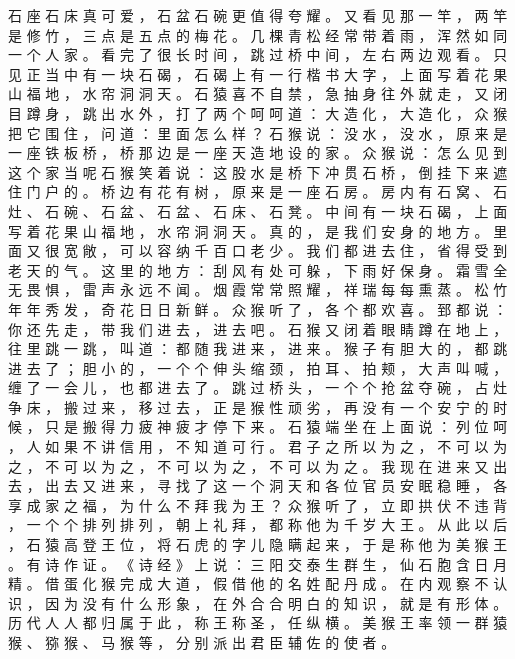 {石 座 石 床 真 可 爱 ， 石 盆 石 碗 更 值 得 夸 耀 。
又 看 见 那 一 竿 ， 两 竿 是 修 竹 ， 三 点 是 五 点 的 梅 花 。
几 棵 青 松 经 常 带 着 雨 ， 浑 然 如 同 一 个 人 家 。
看 完 了 很 长 时 间 ， 跳 过 桥 中 间 ， 左 右 两 边 观 看 。
只 见 正 当 中 有 一 块 石 碣 ， 石 碣 上 有 一 行 楷 书 大 字 ， 上 面 写 着 花 果 山 福 地 ， 水 帘 洞 洞 天 。
石 猿 喜 不 自 禁 ， 急 抽 身 往 外 就 走 ， 又 闭 目 蹲 身 ， 跳 出 水 外 ， 打 了 两 个 呵 呵 道 ： 大 造 化 ， 大 造 化 ， 众 猴 把 它 围 住 ， 问 道 ： 里 面 怎 么 样 ？ 石 猴 说 ： 没 水 ， 没 水 ， 原 来 是 一 座 铁 板 桥 ， 桥 那 边 是 一 座 天 造 地 设 的 家 。
众 猴 说 ： 怎 么 见 到 这 个 家 当 呢 石 猴 笑 着 说 ： 这 股 水 是 桥 下 冲 贯 石 桥 ， 倒 挂 下 来 遮 住 门 户 的 。
桥 边 有 花 有 树 ， 原 来 是 一 座 石 房 。
房 内 有 石 窝 、 石 灶 、 石 碗 、 石 盆 、 石 盆 、 石 床 、 石 凳 。
中 间 有 一 块 石 碣 ， 上 面 写 着 花 果 山 福 地 ， 水 帘 洞 洞 天 。
真 的 ， 是 我 们 安 身 的 地 方 。
里 面 又 很 宽 敞 ， 可 以 容 纳 千 百 口 老 少 。
我 们 都 进 去 住 ， 省 得 受 到 老 天 的 气 。
这 里 的 地 方 ： 刮 风 有 处 可 躲 ， 下 雨 好 保 身 。
霜 雪 全 无 畏 惧 ， 雷 声 永 远 不 闻 。
烟 霞 常 常 照 耀 ， 祥 瑞 每 每 熏 蒸 。
松 竹 年 年 秀 发 ， 奇 花 日 日 新 鲜 。
众 猴 听 了 ， 各 个 都 欢 喜 。
郅 都 说 ： 你 还 先 走 ， 带 我 们 进 去 ， 进 去 吧 。
石 猴 又 闭 着 眼 睛 蹲 在 地 上 ， 往 里 跳 一 跳 ， 叫 道 ： 都 随 我 进 来 ， 进 来 。
猴 子 有 胆 大 的 ， 都 跳 进 去 了 ； 胆 小 的 ， 一 个 个 伸 头 缩 颈 ， 拍 耳 、 拍 颊 ， 大 声 叫 喊 ， 缠 了 一 会 儿 ， 也 都 进 去 了 。
跳 过 桥 头 ， 一 个 个 抢 盆 夺 碗 ， 占 灶 争 床 ， 搬 过 来 ， 移 过 去 ， 正 是 猴 性 顽 劣 ， 再 没 有 一 个 安 宁 的 时 候 ， 只 是 搬 得 力 疲 神 疲 才 停 下 来 。
石 猿 端 坐 在 上 面 说 ： 列 位 呵 ， 人 如 果 不 讲 信 用 ， 不 知 道 可 行 。
君 子 之 所 以 为 之 ， 不 可 以 为 之 ， 不 可 以 为 之 ， 不 可 以 为 之 ， 不 可 以 为 之 。
我 现 在 进 来 又 出 去 ， 出 去 又 进 来 ， 寻 找 了 这 一 个 洞 天 和 各 位 官 员 安 眠 稳 睡 ， 各 享 成 家 之 福 ， 为 什 么 不 拜 我 为 王 ？ 众 猴 听 了 ， 立 即 拱 伏 不 违 背 ， 一 个 个 排 列 排 列 ， 朝 上 礼 拜 ， 都 称 他 为 千 岁 大 王 。
从 此 以 后 ， 石 猿 高 登 王 位 ， 将 石 虎 的 字 儿 隐 瞒 起 来 ， 于 是 称 他 为 美 猴 王 。
有 诗 作 证 。
《 诗 经 》 上 说 ： 三 阳 交 泰 生 群 生 ， 仙 石 胞 含 日 月 精 。
借 蛋 化 猴 完 成 大 道 ， 假 借 他 的 名 姓 配 丹 成 。
在 内 观 察 不 认 识 ， 因 为 没 有 什 么 形 象 ， 在 外 合 合 明 白 的 知 识 ， 就 是 有 形 体 。
历 代 人 人 都 归 属 于 此 ， 称 王 称 圣 ， 任 纵 横 。
美 猴 王 率 领 一 群 猿 猴 、 猕 猴 、 马 猴 等 ， 分 别 派 出 君 臣 辅 佐 的 使 者 。
}
